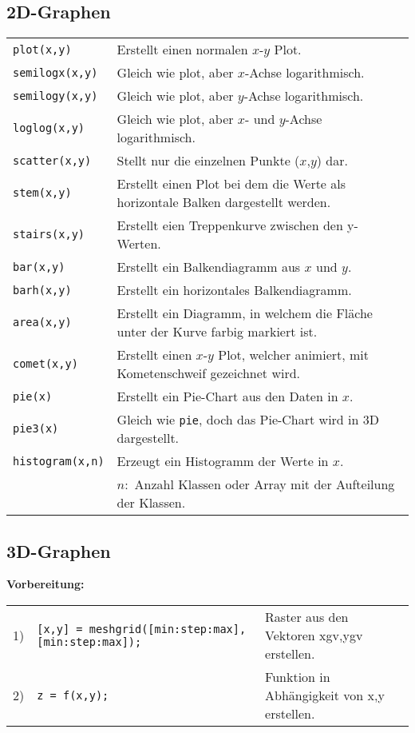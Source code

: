 \subsection{2D-Graphen}
\begin{tabular}{ll}
	\texttt{plot(x,y)} & Erstellt einen normalen $x$-$y$ Plot. \\
	\texttt{semilogx(x,y)} & Gleich wie plot, aber $x$-Achse logarithmisch. \\
	\texttt{semilogy(x,y)} & Gleich wie plot, aber $y$-Achse logarithmisch. \\
	\texttt{loglog(x,y)} & Gleich wie plot, aber $x$- und $y$-Achse logarithmisch. \\	
	\texttt{scatter(x,y)} & Stellt nur die einzelnen Punkte ($x$,$y$) dar. \\
	\texttt{stem(x,y)} & Erstellt einen Plot bei dem die Werte als horizontale Balken dargestellt werden. \\
	\texttt{stairs(x,y)} & Erstellt eien Treppenkurve zwischen den y-Werten. \\
	\texttt{bar(x,y)} & Erstellt ein Balkendiagramm aus $x$ und $y$.\\
	\texttt{barh(x,y)} & Erstellt ein horizontales Balkendiagramm. \\
	\texttt{area(x,y)} & Erstellt ein Diagramm, in welchem die Fläche unter der Kurve farbig markiert ist. \\
	\texttt{comet(x,y)} & Erstellt einen $x$-$y$ Plot, welcher animiert, mit Kometenschweif gezeichnet wird. \\
	\texttt{pie(x)} & Erstellt ein Pie-Chart aus den Daten in $x$. \\
	\texttt{pie3(x)} & Gleich wie \texttt{pie}, doch das Pie-Chart wird in 3D dargestellt. \\
	\texttt{histogram(x,n)} & Erzeugt ein Histogramm der Werte in $x$. \\ & $n:$ Anzahl Klassen oder Array mit der Aufteilung der Klassen. \\
\end{tabular}

\subsection{3D-Graphen}
\textbf{Vorbereitung:} \\
\begin{tabular}{lll}
	1) & \texttt{[x,y] = meshgrid([min:step:max],[min:step:max]);} & Raster aus den Vektoren xgv,ygv erstellen. \\
	2) & \texttt{z = f(x,y);} & Funktion in Abhängigkeit von x,y erstellen. \\
\end{tabular} \\

